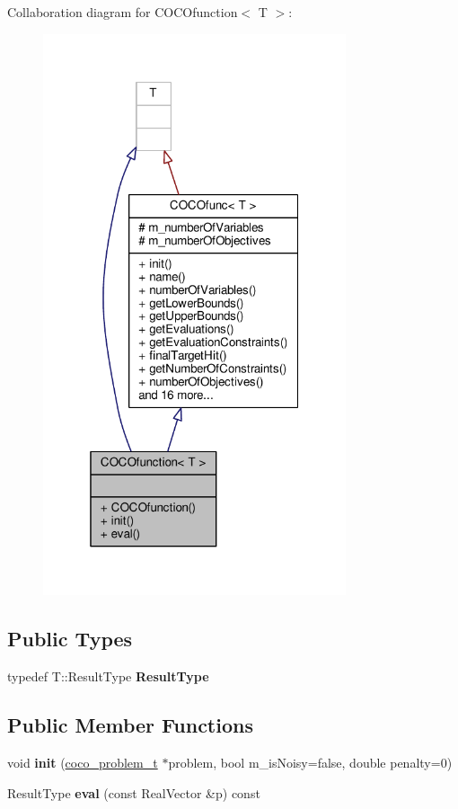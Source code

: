 Collaboration diagram for C\+O\+C\+Ofunction$<$ T $>$\+:
\nopagebreak
\begin{figure}[H]
\begin{center}
\leavevmode
\includegraphics[width=253pt]{classCOCOfunction__coll__graph}
\end{center}
\end{figure}
\subsection*{Public Types}
\begin{DoxyCompactItemize}
\item 
typedef T\+::\+Result\+Type {\bfseries Result\+Type}\hypertarget{classCOCOfunction_a535e090463fa7f2f83e15ee07cdeff9f}{}\label{classCOCOfunction_a535e090463fa7f2f83e15ee07cdeff9f}

\end{DoxyCompactItemize}
\subsection*{Public Member Functions}
\begin{DoxyCompactItemize}
\item 
void {\bfseries init} (\hyperlink{structcoco__problem__s}{coco\+\_\+problem\+\_\+t} $\ast$problem, bool m\+\_\+is\+Noisy=false, double penalty=0)\hypertarget{classCOCOfunction_a6a8a709fee4fd237ff3c0fea9e07d24a}{}\label{classCOCOfunction_a6a8a709fee4fd237ff3c0fea9e07d24a}

\item 
Result\+Type {\bfseries eval} (const Real\+Vector \&p) const \hypertarget{classCOCOfunction_a1025af8ace38742279c326cd19410f9a}{}\label{classCOCOfunction_a1025af8ace38742279c326cd19410f9a}

\end{DoxyCompactItemize}
